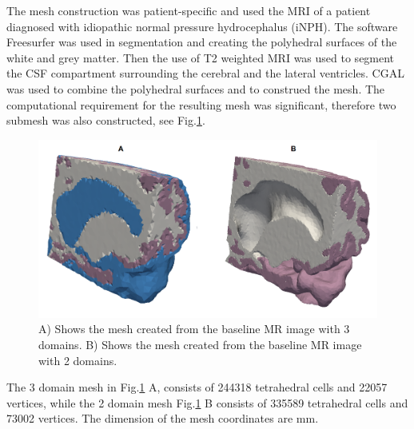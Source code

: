 \documentclass[11pt,a4paper]{article}
\begin{document}
The mesh construction was patient-specific and used the MRI of a patient diagnosed with idiopathic normal pressure hydrocephalus (iNPH). The software Freesurfer was used in segmentation and creating the polyhedral surfaces of the white and grey matter. Then the use of T2 weighted MRI \cite{eidevalnes} was used to segment the CSF compartment surrounding the cerebral and the lateral ventricles. CGAL \cite{cgal:rty-m3-18b} was used to combine the polyhedral surfaces and to construed the mesh. The computational requirement for the resulting mesh was significant, therefore two submesh was also constructed, see Fig.\ref{Fig::Mesh}.
\begin{figure}
\centering
\includegraphics[scale=0.2]{mesh.png} 
\caption{A) Shows the mesh created from the baseline MR image with 3 domains. B) Shows the mesh created from the baseline MR image with 2 domains.  }
\label{Fig::Mesh}
\end{figure}
The 3 domain mesh in Fig.\ref{Fig::Mesh} A, consists of 244318 tetrahedral cells and 22057 vertices, while the 2 domain mesh Fig.\ref{Fig::Mesh} B consists of 335589 tetrahedral cells and 73002 vertices. The dimension of the mesh coordinates are $\mathrm{mm}$.
\end{document}
